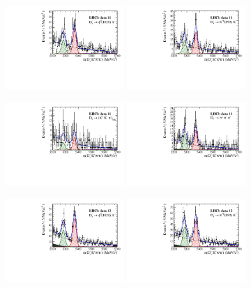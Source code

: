 \begin{figure}[h]
\centering
\includegraphics[height=!,width=0.4\textwidth]{figs/MassFit/signal_y11_phipi.pdf}
\includegraphics[height=!,width=0.4\textwidth]{figs/MassFit/signal_y11_KsK.pdf}

\includegraphics[height=!,width=0.4\textwidth]{figs/MassFit/signal_y11_KKpi_NR.pdf}
\includegraphics[height=!,width=0.4\textwidth]{figs/MassFit/signal_y11_pipipi.pdf}

\includegraphics[height=!,width=0.4\textwidth]{figs/MassFit/signal_y12_phipi.pdf}
\includegraphics[height=!,width=0.4\textwidth]{figs/MassFit/signal_y12_KsK.pdf}


\end{figure}
